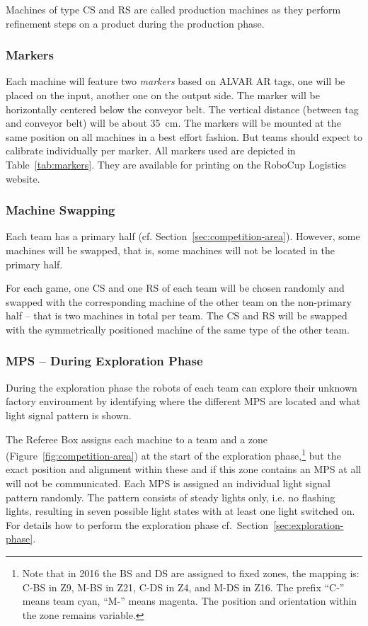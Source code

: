 \documentclass[12pt,twoside]{article}
\newcommand{\refsec}[1]{Section~\ref{#1}}
\newcommand{\reffig}[1]{Figure~\ref{#1}}
\newcommand{\reftab}[1]{Table~\ref{#1}}
\begin{document}
\noindent
Machines of type CS and RS are called production machines as they
perform refinement steps on a product during the production phase.

\subsubsection{Markers}
\label{sec:markers}
Each machine will feature two \emph{markers} based on ALVAR AR tags,
one will be placed on the input, another one on the output side. The
marker will be horizontally centered below the conveyor belt. The
vertical distance (between tag and conveyor belt) will be about 
\SI{35}{\centi\metre}. The markers will be mounted at the same position 
on all machines in a best effort fashion. But teams should expect to 
calibrate individually per marker. All markers used are depicted in 
\reftab{tab:markers}. They are available for printing on the RoboCup 
Logistics website.


\subsubsection{Machine Swapping}
\label{sec:machine-swapping}
Each team has a primary half
(cf. \refsec{sec:competition-area}). However, some machines will be
swapped, that is, some machines will not be located in the primary
half.

For each game, one CS and one RS of each team will be chosen randomly
and swapped with the corresponding machine of the other team on the
non-primary half -- that is two machines in total per team. The CS and
RS will be swapped with the symmetrically positioned machine of the
same type of the other team.

\subsubsection{MPS -- During Exploration Phase}
\label{sec:production-machines-exp}
During the exploration phase the robots of each team can explore their
unknown factory environment by identifying where the different MPS are
located and what light signal pattern is shown.

The Referee Box assigns each machine to a team and a zone
(\reffig{fig:competition-area}) at the start of the exploration
phase,\footnote{Note that in 2016 the BS and DS are assigned to fixed
  zones, the mapping is: C-BS in Z9, M-BS in Z21, C-DS in Z4, and M-DS
  in Z16. The prefix ``C-'' means team cyan, ``M-'' means magenta. The
  position and orientation within the zone remains variable.}  but the
exact position and alignment within these and if this zone contains an
MPS at all will not be communicated. Each MPS is assigned an
individual light signal pattern randomly. The pattern consists of
steady lights only, i.e. no flashing lights, resulting in seven
possible light states with at least one light switched on. For details
how to perform the exploration phase
cf.~\refsec{sec:exploration-phase}.
\end{document}
